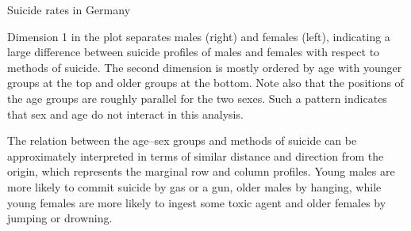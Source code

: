 \documentclass[11pt]{book}
\renewenvironment{knitrout}{\small\renewcommand{\baselinestretch}{.85}}{} %
\begin{document}
\begin{Example}[suicide1]{Suicide rates in Germany}
\begin{knitrout}
\end{knitrout}

Dimension 1 in the plot separates males (right) and females (left),
indicating a large difference between suicide profiles of males and
females with respect to methods of suicide.  
The second dimension is mostly ordered by age with younger
groups at the top and older groups at the bottom.  Note also that the
positions of the age groups are roughly parallel for the two
sexes.  
Such a pattern indicates that sex and age do not interact in this analysis.

The relation between the age--sex groups and methods
of suicide can be approximately interpreted in terms of similar distance and
direction from the origin, which represents the marginal row and
column profiles.  Young males are more likely to commit suicide by
gas or a gun, older males by hanging, while young females are more
likely to ingest some toxic agent and older females by jumping or
drowning.
\end{Example}
\end{document}
